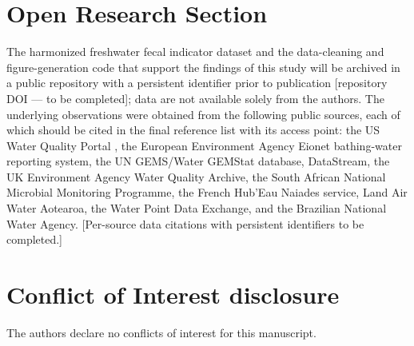 \documentclass{agujournal2019}
\begin{document}
\section*{Open Research Section}
The harmonized freshwater fecal indicator dataset and the data-cleaning and figure-generation code that support the findings of this study will be archived in a public repository with a persistent identifier prior to publication [repository DOI --- to be completed]; data are not available solely from the authors. The underlying observations were obtained from the following public sources, each of which should be cited in the final reference list with its access point: the US Water Quality Portal \cite{read2017water}, the European Environment Agency Eionet bathing-water reporting system, the UN GEMS/Water GEMStat database, DataStream, the UK Environment Agency Water Quality Archive, the South African National Microbial Monitoring Programme, the French Hub'Eau Naiades service, Land Air Water Aotearoa, the Water Point Data Exchange, and the Brazilian National Water Agency. [Per-source data citations with persistent identifiers to be completed.]

\section*{Conflict of Interest disclosure}
The authors declare no conflicts of interest for this manuscript.



\end{document}
